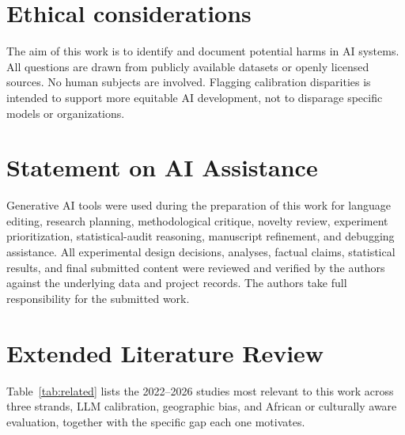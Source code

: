 \documentclass[11pt]{article}
\begin{document}
\section*{Ethical considerations}

The aim of this work is to identify and document potential harms in AI systems. All questions are drawn from publicly available datasets or openly licensed sources. No human subjects are involved. Flagging calibration disparities is intended to support more equitable AI development, not to disparage specific models or organizations.

\section*{Statement on AI Assistance}

Generative AI tools were used during the preparation of this work for language editing, research planning, methodological critique, novelty review, experiment prioritization, statistical-audit reasoning, manuscript refinement, and debugging assistance. All experimental design decisions, analyses, factual claims, statistical results, and final submitted content were reviewed and verified by the authors against the underlying data and project records. The authors take full responsibility for the submitted work.



\appendix

\section{Extended Literature Review}
\label{app:related}

Table~\ref{tab:related} lists the 2022--2026 studies most relevant to this work across three strands, LLM calibration, geographic bias, and African or culturally aware evaluation, together with the specific gap each one motivates.
\end{document}
